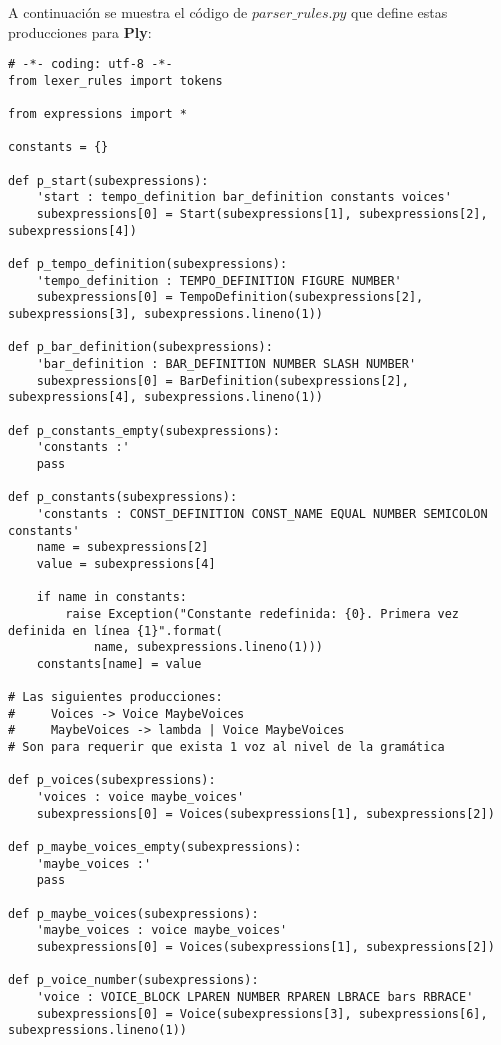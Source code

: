 A continuación se muestra el código de $parser\_rules.py$ que define estas producciones para \textbf{Ply}:

\begin{verbatim}
# -*- coding: utf-8 -*-
from lexer_rules import tokens

from expressions import *

constants = {}

def p_start(subexpressions):
    'start : tempo_definition bar_definition constants voices'
    subexpressions[0] = Start(subexpressions[1], subexpressions[2], subexpressions[4])

def p_tempo_definition(subexpressions):
    'tempo_definition : TEMPO_DEFINITION FIGURE NUMBER'
    subexpressions[0] = TempoDefinition(subexpressions[2], subexpressions[3], subexpressions.lineno(1))

def p_bar_definition(subexpressions):
    'bar_definition : BAR_DEFINITION NUMBER SLASH NUMBER'
    subexpressions[0] = BarDefinition(subexpressions[2], subexpressions[4], subexpressions.lineno(1))

def p_constants_empty(subexpressions):
    'constants :'
    pass

def p_constants(subexpressions):
    'constants : CONST_DEFINITION CONST_NAME EQUAL NUMBER SEMICOLON constants'
    name = subexpressions[2]
    value = subexpressions[4]

    if name in constants:
        raise Exception("Constante redefinida: {0}. Primera vez definida en línea {1}".format(
            name, subexpressions.lineno(1)))
    constants[name] = value

# Las siguientes producciones:
#     Voices -> Voice MaybeVoices
#     MaybeVoices -> lambda | Voice MaybeVoices
# Son para requerir que exista 1 voz al nivel de la gramática

def p_voices(subexpressions):
    'voices : voice maybe_voices'
    subexpressions[0] = Voices(subexpressions[1], subexpressions[2])

def p_maybe_voices_empty(subexpressions):
    'maybe_voices :'
    pass

def p_maybe_voices(subexpressions):
    'maybe_voices : voice maybe_voices'
    subexpressions[0] = Voices(subexpressions[1], subexpressions[2])

def p_voice_number(subexpressions):
    'voice : VOICE_BLOCK LPAREN NUMBER RPAREN LBRACE bars RBRACE'
    subexpressions[0] = Voice(subexpressions[3], subexpressions[6], subexpressions.lineno(1))


\end{verbatim}
